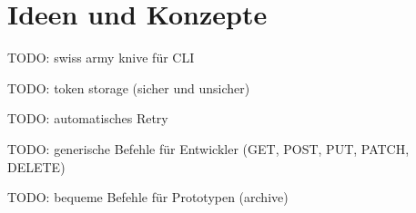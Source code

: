 \section{Ideen und Konzepte}

TODO: swiss army knive \cite[p. 290]{gopl} für CLI

TODO: token storage (sicher und unsicher)

TODO: automatisches Retry

TODO: generische Befehle für Entwickler (GET, POST, PUT, PATCH, DELETE)

TODO: bequeme Befehle für Prototypen (archive)

